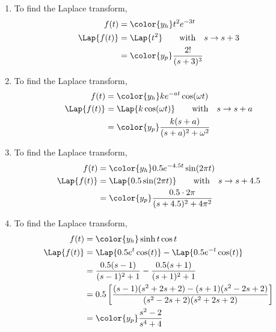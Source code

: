 \begin{enumerate}
      \item To find the Laplace transform,
            \begin{align}
                  f(t)         & = \color{y_h} t^2e^{-3t}           \\
                  \Lap\{f(t)\} & = \Lap\{t^2\} \qquad
                  \text{with}\quad s \rightarrow s+3                \\
                               & = \color{y_p} \frac{2!}{(s+3)^{3}}
            \end{align}

      \item To find the Laplace transform,
            \begin{align}
                  f(t)         & = \color{y_h} ke^{-at}\cos(\omega t)            \\
                  \Lap\{f(t)\} & = \Lap\{k\cos(\omega t)\} \qquad
                  \text{with}\quad s \rightarrow s+a                             \\
                               & = \color{y_p} \frac{k(s+a)}{(s+a)^2 + \omega^2}
            \end{align}

      \item To find the Laplace transform,
            \begin{align}
                  f(t)         & = \color{y_h} 0.5e^{-4.5t}\sin(2\pi t) \\
                  \Lap\{f(t)\} & = \Lap\{0.5\sin(2\pi t)\} \qquad
                  \text{with}\quad s \rightarrow s+4.5                  \\
                               & = \color{y_p} \frac{0.5 \cdot 2\pi}
                  {(s+4.5)^2 + 4\pi^2}
            \end{align}

      \item To find the Laplace transform,
            \begin{align}
                  f(t)         & = \color{y_h} \sinh t \cos t                         \\
                  \Lap\{f(t)\} & = \Lap\{0.5e^{t}\cos(t)\} - \Lap\{0.5e^{-t}\cos(t)\} \\
                               & = \frac{0.5(s-1)}{(s-1)^2 + 1}
                  - \frac{0.5(s+1)}{(s+1)^2 + 1}                                      \\
                               & = 0.5\left[ \frac{(s-1)(s^2+2s+2)
                  - (s+1)(s^2 - 2s + 2)} {(s^2 - 2s + 2)(s^2 + 2s + 2)} \right]       \\
                               & = \color{y_p}\frac{s^2 - 2}{s^4 + 4}
            \end{align}


\end{enumerate}
